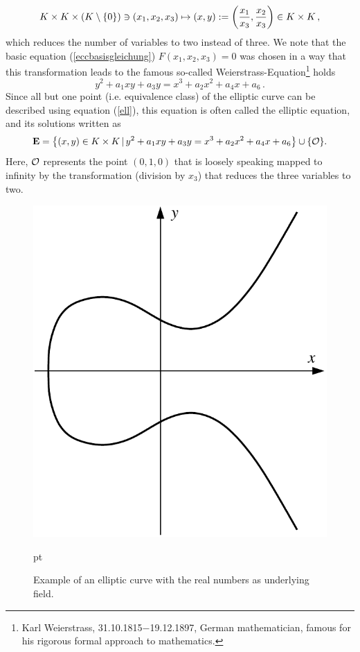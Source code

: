 $$ K\times K\times (K\setminus\{0\})\ni (x_1,x_2,x_3) \mapsto (x,y):=\left( {x_1\over x_3}, {x_2\over x_3}\right) \in K\times K \, ,
$$
which reduces the number of variables to two instead of three. We note that the
basic equation (\ref{eccbasisgleichung}) $F(x_1,x_2,x_3)=0$  was chosen in a
way that this transformation leads to the famous so-called
Weierstrass-Equation\footnote{Karl Weierstrass, 31.10.1815$-$19.12.1897, German
mathematician, famous for his rigorous formal approach to mathematics.} holds
\begin{equation}
 y^2+a_1xy+a_3y = x^3+a_2x^2+a_4x+a_6 \, .
\label{ell}
\end{equation}
Since all but one point (i.e. equivalence class) of the elliptic curve can be described using equation (\ref{ell}), this equation is often called the elliptic equation, and its solutions written as
$$ {\bf E} = \left\{(x,y)\in K\times K \, |\, y^2+a_1xy+a_3y = x^3+a_2x^2+a_4x+a_6  \right\} \cup \{{\cal O} \}.
$$
Here, ${\cal O}$ represents the point $(0,1,0)$ that is loosely speaking mapped to infinity by the transformation (division by $x_3$) that reduces the three variables to two.

\begin{figure}[h]
\begin{center}
\includegraphics[scale=0.60]{figures/elliptic-curve}
\caption{Example of an elliptic curve with the real numbers as underlying field.\vspace{1ex}} 
\label{ExampleEllipticCurve}
\end{center}
 pt
\end{figure}

